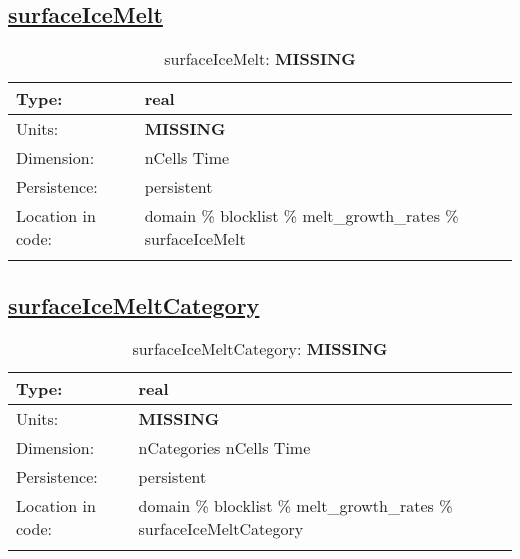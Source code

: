 \subsection[surfaceIceMelt]{\hyperref[sec:var_tab_melt_growth_rates]{surfaceIceMelt}}
\label{subsec:var_sec_melt_growth_rates_surfaceIceMelt}
\begin{center}
\begin{longtable}{| p{2.0in} | p{4.0in} |}
        \hline 
        Type: & real \\
        \hline 
        Units: & {\bf \color{red} MISSING} \\
        \hline 
        Dimension: & nCells Time \\
        \hline 
        Persistence: & persistent \\
        \hline 
         Location in code: & domain \% blocklist \% melt\_growth\_rates \% surfaceIceMelt \\
         \hline 
    \caption{surfaceIceMelt: {\bf \color{red} MISSING}}
\end{longtable}
\end{center}
\subsection[surfaceIceMeltCategory]{\hyperref[sec:var_tab_melt_growth_rates]{surfaceIceMeltCategory}}
\label{subsec:var_sec_melt_growth_rates_surfaceIceMeltCategory}
\begin{center}
\begin{longtable}{| p{2.0in} | p{4.0in} |}
        \hline 
        Type: & real \\
        \hline 
        Units: & {\bf \color{red} MISSING} \\
        \hline 
        Dimension: & nCategories nCells Time \\
        \hline 
        Persistence: & persistent \\
        \hline 
         Location in code: & domain \% blocklist \% melt\_growth\_rates \% surfaceIceMeltCategory \\
         \hline 
    \caption{surfaceIceMeltCategory: {\bf \color{red} MISSING}}
\end{longtable}
\end{center}
